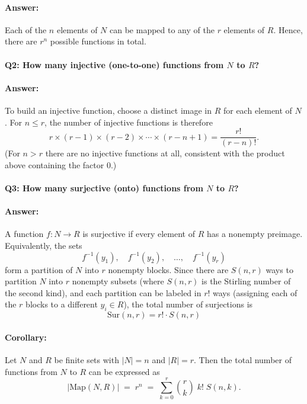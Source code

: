 \documentclass[docmute]{article}
\begin{document}
\paragraph{Answer:} 
Each of the \(n\) elements of \(N\) can be mapped to any of the \(r\) elements of \(R\). Hence, there are \(r^n\) possible functions in total.

\paragraph{Q2: How many injective (one-to-one) functions from \(N\) to \(R\)?}
\paragraph{Answer:} 
To build an injective function, choose a distinct image in \(R\) for each element of \(N\). For \(n \le r\), the number of injective functions is therefore
\[
r \times (r - 1) \times (r - 2) \times \cdots \times (r - n + 1)
= \frac{r!}{(r - n)!}.
\]
(For \(n > r\) there are no injective functions at all, consistent with the product above containing the factor \(0\).)

\paragraph{Q3: How many surjective (onto) functions from \(N\) to \(R\)?}
\paragraph{Answer:}
A function \(f : N \to R\) is surjective if every element of \(R\) has a nonempty preimage. Equivalently, the sets 
\[
f^{-1}(y_1), \quad f^{-1}(y_2), \quad \dots, \quad f^{-1}(y_r)
\]
form a partition of \(N\) into \(r\) nonempty blocks. Since there are \(S(n,r)\) ways to partition \(N\) into \(r\) nonempty subsets (where \(S(n,r)\) is the Stirling number of the second kind), and each partition can be labeled in \(r!\) ways (assigning each of the \(r\) blocks to a different \(y_i \in R\)), the total number of surjections is
\[
\text{Sur}(n, r) = r! \cdot S(n, r)
\]

\paragraph{Corollary:}
Let \(N\) and \(R\) be finite sets with \(|N| = n\) and \(|R| = r\). Then the total number of functions from \(N\) to \(R\) can be expressed as
\[
| \mathrm{Map}(N, R) | \;=\; r^n \;=\; \sum_{k=0}^{r} \binom{r}{k} \; k! \; S(n,k).
\]
\end{document}
